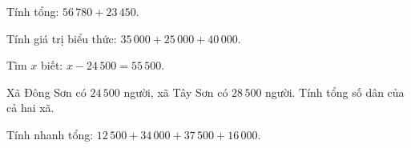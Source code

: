 \begin{ex} %
Tính tổng: $56\,780 + 23\,450$.
\end{ex}

\begin{ex} %
Tính giá trị biểu thức: $35\,000 + 25\,000 + 40\,000$.
\end{ex}

\begin{ex} %
Tìm $x$ biết: $x - 24\,500 = 55\,500$.
\end{ex}

\begin{ex} %
Xã Đông Sơn có $24\,500$ người, xã Tây Sơn có $28\,500$ người. Tính tổng số dân của cả hai xã.
\end{ex}

\begin{ex} %
Tính nhanh tổng: $12\,500 + 34\,000 + 37\,500 + 16\,000$.
\end{ex}
